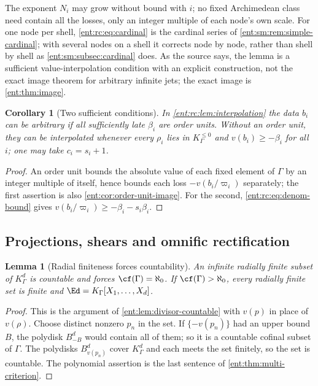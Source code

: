 \documentclass[11pt]{article}
\theoremstyle{plain}
\newtheorem{lemma}[lemma]{Lemma}
\theoremstyle{plain}
\theoremstyle{plain}
\newtheorem{corollary}[corollary]{Corollary}
\theoremstyle{definition}
\theoremstyle{definition}
\theoremstyle{definition}
\theoremstyle{definition}
\theoremstyle{remark}
\newcommand{\K}{K_\Gamma}\newcommand{\KD}{K_\Delta}
\newcommand{\Kle}{K_\Gamma^{\le0}}\DeclareMathOperator{\Jac}{Jac}
\begin{document}
The exponent $N_i$ may grow without bound with $i$; no fixed Archimedean
class need contain all the losses, only an integer multiple of each node's
own scale. For one node per shell, \eqref{ent:rc:eq:cardinal} is the
cardinal series of \cref{ent:sm:rem:simple-cardinal}; with several nodes on a
shell it corrects node by node, rather than shell by shell as
\cref{ent:sm:subsec:cardinal} does. As the source says, the lemma is a
sufficient value-interpolation condition with an explicit construction, not
the exact image theorem for arbitrary infinite jets; the exact image is
\cref{ent:thm:image}.

\begin{corollary}[Two sufficient conditions]\label{ent:rc:cor:interp-cases}
In \cref{ent:rc:lem:interpolation} the data $b_i$ can be arbitrary if all
sufficiently late $\beta_i$ are order units. Without an order unit, they can
be interpolated whenever every $\rho_i$ lies in $\Kle$ and
$v(b_i)\ge-\beta_i$ for all $i$; one may take $c_i=s_i+1$.
\end{corollary}
\begin{proof}
An order unit bounds the absolute value of each fixed element of $\Gamma$ by
an integer multiple of itself, hence bounds each loss $-v(b_i/\varpi_i)$
separately; the first assertion is also \cref{ent:cor:order-unit-image}. For
the second, \eqref{ent:rc:eq:denom-bound} gives
$v(b_i/\varpi_i)\ge-\beta_i-s_i\beta_i$.
\end{proof}

\subsection{Projections, shears and omnific rectification}
\label{ent:rc:subsec:rectification}

\begin{lemma}[Radial finiteness forces countability]\label{ent:rc:lem:countable}
An infinite radially finite subset of $\K^d$ is countable and forces
$\cf(\Gamma)=\aleph_0$. If $\cf(\Gamma)>\aleph_0$, every radially finite set
is finite and $\Ed=\K[X_1,\ldots,X_d]$.
\end{lemma}
\begin{proof}
This is the argument of \cref{ent:lem:divisor-countable} with $v(p)$ in place
of $v(\rho)$. Choose distinct nonzero $p_n$ in the set. If
$\{-v(p_n)\}$ had an upper bound $B$, the polydisk $B^d_{-B}$ would contain
all of them; so it is a countable cofinal subset of $\Gamma$. The polydisks
$B^d_{v(p_n)}$ cover $\K^d$ and each meets the set finitely, so the set is
countable. The polynomial assertion is the last sentence of
\cref{ent:thm:multi-criterion}.
\end{proof}
\end{document}
